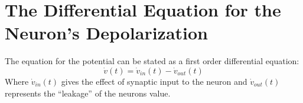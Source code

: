 %
%
%
%









\section{The Differential Equation for the Neuron's Depolarization} 
The equation for the potential can be stated as a first order differential equation:
\begin{equation}
	\dot{v}(t) = \dot{v}_{in}(t) - \dot{v}_{out}(t) %
\end{equation}
Where $\dot{v}_{in}(t)$ gives the effect of synaptic input to the neuron and $\dot{v}_{out}(t)$ represents the ``leakage'' of the neurons value.



